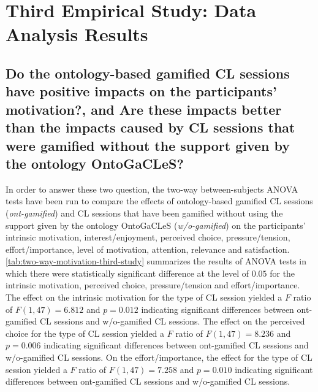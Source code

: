 \section{Third Empirical Study: Data Analysis Results}
\label{sec:third-study}

\subsection*{Do the ontology-based gamified CL sessions have positive impacts on the participants' motivation?, and Are these impacts better than the impacts caused by CL sessions that were gamified without the support given by the ontology OntoGaCLeS?}

In order to answer these two question, the two-way between-subjects ANOVA tests have been run to compare the effects of ontology-based gamified CL sessions (\emph{ont-gamified}) and CL sessions that have been gamified without using the support given by the ontology OntoGaCLeS (\emph{w/o-gamified}) on the participants' intrinsic motivation, interest/enjoyment, perceived choice, pressure/tension, effort/importance, level of motivation, attention, relevance and satisfaction. \autoref{tab:two-way-motivation-third-study}  summarizes the results of ANOVA tests in which 
there were statistically significant difference at the level of $0.05$ for the intrinsic motivation, perceived choice, pressure/tension and effort/importance.
The effect on the intrinsic motivation for the type of CL session yielded a $F$ ratio of $F(1,47) = 6.812$ and $p = 0.012$ indicating significant differences between ont-gamified CL sessions and w/o-gamified CL sessions. The effect on the perceived choice for the type of CL session yielded a $F$ ratio of $F(1,47) = 8.236$ and $p = 0.006$ indicating significant differences between ont-gamified CL sessions and w/o-gamified CL sessions. On the effort/importance, the effect for the type of CL session yielded a $F$ ratio of $F(1,47) = 7.258$ and $p = 0.010$ indicating significant differences between ont-gamified CL sessions and w/o-gamified CL sessions. 

